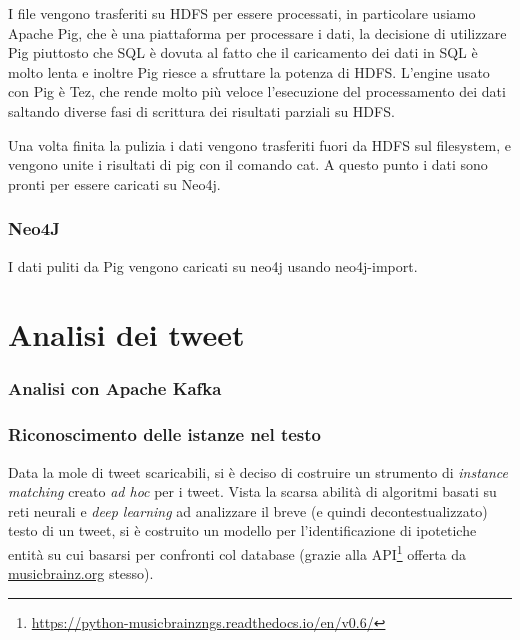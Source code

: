\documentclass[12pt, a4paper, twocolumn]{article} %
\begin{document}

I file vengono trasferiti su HDFS per essere processati, in particolare usiamo Apache Pig, che è una piattaforma per processare i dati, la decisione di utilizzare Pig piuttosto che SQL è dovuta al fatto che il caricamento dei dati in SQL è molto lenta e inoltre Pig riesce a sfruttare la potenza di HDFS.
L'engine usato con Pig è Tez, che rende molto più veloce l'esecuzione del processamento dei dati saltando diverse fasi di scrittura dei risultati parziali su HDFS.

Una volta finita la pulizia i dati vengono trasferiti fuori da HDFS sul filesystem, e vengono unite i risultati di pig con il comando cat. A questo punto i dati sono pronti per essere caricati su Neo4j.


\section{Neo4J}

I dati puliti da Pig vengono caricati su neo4j usando neo4j-import.

\hfill
\newpage
\part{Analisi dei tweet}
\section{Analisi con Apache Kafka}
\section{Riconoscimento delle istanze nel testo}
Data la mole di tweet scaricabili, si è deciso di costruire un strumento di \textit{instance matching} creato \textit{ad hoc} per i tweet.
Vista la scarsa abilità di algoritmi basati su reti neurali e \textit{deep learning} ad analizzare il breve (e quindi decontestualizzato) testo di un tweet, si è costruito un modello per l'identificazione di ipotetiche entità su cui basarsi per confronti col database (grazie alla API\footnote{\url{https://python-musicbrainzngs.readthedocs.io/en/v0.6/}} offerta da \url{musicbrainz.org} stesso).
\end{document}
